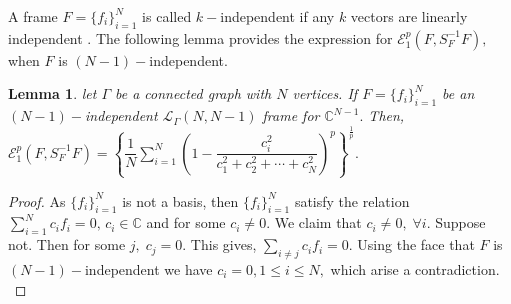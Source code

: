 \documentclass[final,1p,times]{elsarticle}
\newtheorem{lem}[thm]{Lemma}
\begin{document}
A frame $F= \{f_i\}_{i=1}^N$ is called $k-$independent if any $k$ vectors are linearly independent \cite{sali}. The following lemma provides the expression for $\mathcal{E}_{1}^p\left( F, S_{F}^{-1}F \right),$ when $F$ is $(N-1)-$independent.
\begin{lem}\label{lemma5point6}
	let $\Gamma$ be a connected graph with $N$ vertices. If $F= \{f_i\}_{i=1}^N$ be an $(N-1)-$independent $\mathcal{L}_{\Gamma}(N,N-1)$ frame for $\mathbb{C}^{N-1}.$ Then,   $\mathcal{E}_{1}^p\left( F, S_{F}^{-1}F \right) = \left\{\dfrac{1}{N} \sum\limits_{i=1}^N \left(1- \dfrac{c_{i}^2}{c_{1}^2 + c_{2}^2 + \cdots + c_{N}^2}\right)^p\right\}^{\frac{1}{p}} .$  
\end{lem}

\begin{proof}
	As  $ \{f_i\}_{i=1}^N$ is not a basis, then  $ \{f_i\}_{i=1}^N$ satisfy the relation $\sum\limits_{i=1}^N c_i f_i =0,\,c_i \in \mathbb{C}$ and for some $c_i \neq 0.$ We claim that $c_i \neq 0,\;\forall i.$ Suppose not. Then for some $j,\;c_j =0.$ This gives, $\sum\limits_{i \neq j} c_i f_i =0.$ Using the face that $F$ is  $(N-1)-$independent we have $c_i =0, 1\leq i \leq N,$ which arise a contradiction.\\ 

\end{proof}
\end{document}
